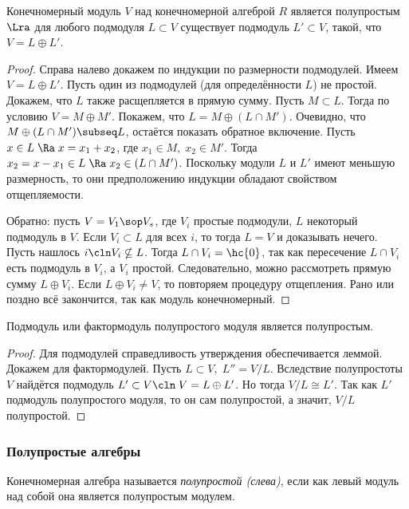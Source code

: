 \documentclass[a4paper]{article}
\begin{document}
\begin{lemma}
Конечномерный модуль $V$ над конечномерной алгеброй $R$ является полупростым $\Lra$ для любого
подмодуля $L \subset V$ существует подмодуль $L' \subset V$, такой, что $V=L \oplus L'$.
\end{lemma}
\begin{proof}
Справа налево докажем по индукции по размерности подмодулей. Имеем $V=L \oplus L'$. Пусть один из подмодулей
(для определённости $L$) не простой. Докажем, что $L$ также расщепляется в прямую сумму. Пусть $M \subset L$.
Тогда по условию $V=M \oplus M'$. Покажем, что $L=M \oplus (L \cap M')$. Очевидно, что $M \oplus (L \cap M')
\subseq L$, остаётся показать обратное включение. Пусть $x \in L \; \Ra \; x=x_1 + x_2$, где $x_1 \in M, \;
x_2 \in M'$. Тогда $x_2 = x-x_1 \in L \; \Ra \; x_2 \in (L \cap M')$. Поскольку модули $L$ и $L'$ имеют
меньшую размерность, то они предположению индукции обладают свойством отщепляемости.

Обратно: пусть $V= V_1 \sop V_s$, где $V_i$ простые подмодули, $L$ некоторый подмодуль в $V$.  Если
$V_i \subset L$ для всех $i$, то тогда $L=V$ и доказывать нечего. Пусть нашлось $i\cln V_i \nsubseteq L$.
Тогда $L \cap V_i = \hc{0}$, так как пересечение $L \cap V_i$ есть подмодуль в $V_i$, а $V_i$ простой.
Следовательно, можно рассмотреть прямую сумму $L \oplus V_i$. Если $L \oplus V_i \neq V$, то повторяем
процедуру отщепления. Рано или поздно всё закончится, так как модуль конечномерный.
\end{proof}

\begin{imp}
Подмодуль или фактормодуль полупростого модуля является полупростым.
\end{imp}
\begin{proof}
Для подмодулей справедливость утверждения обеспечивается леммой. Докажем для фактормодулей.  Пусть $L \subset
V, \; L''=V/L$. Вследствие полупростоты $V$ найдётся подмодуль $L' \subset V\cln \; V=L\oplus L'$. Но тогда
$V/L \cong L'$. Так как $L'$ подмодуль полупростого модуля, то он сам полупростой, а значит, $V/L$
полупростой.
\end{proof}

\subsubsection{Полупростые алгебры}

\begin{df}
Конечномерная алгебра называется \emph{полупростой (слева)}, если как левый модуль над собой она  является
полупростым модулем.
\end{df}
\end{document}
